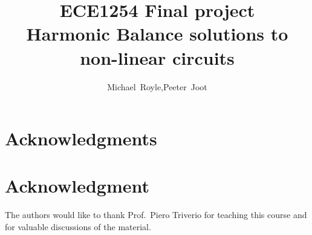 \documentclass[12pt,journal,compsoc]{../ieeepaper/IEEEtran}
\begin{document}
\title{ECE1254 Final project \\ 
Harmonic Balance solutions to non-linear circuits
}

\author{Michael~Royle,Peeter~Joot}


\maketitle

\IEEEdisplaynontitleabstractindextext
\IEEEpeerreviewmaketitle





\ifCLASSOPTIONcompsoc
  \section*{Acknowledgments}
\else
  \section*{Acknowledgment}
\fi


The authors would like to thank Prof.\ Piero Triverio for teaching this course and for valuable discussions of the material.

\ifCLASSOPTIONcaptionsoff
  \newpage
\fi


\label{app:bibliography}



\end{document}

